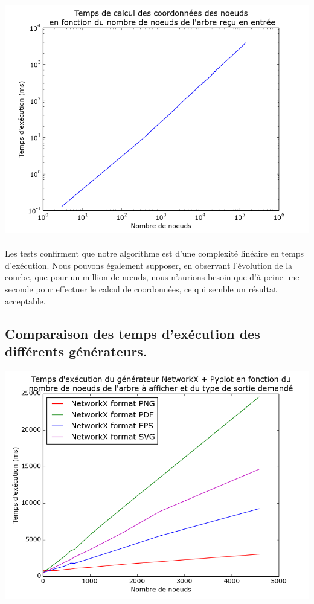 \begin{center}

\includegraphics[width=\columnwidth]{execTimeCoord}

\end{center}

\paragraph{} Les tests confirment que notre algorithme est d'une complexité linéaire en temps d'exécution. Nous pouvons également supposer, en observant l'évolution de la courbe, que pour un million de n\oe uds, nous n'aurions besoin que d'à peine une seconde pour effectuer le calcul de coordonnées, ce qui semble un résultat acceptable.

	\subsection{Comparaison des temps d'exécution des différents générateurs.}

\begin{center}

\includegraphics[width=\columnwidth]{execTimeNX}

\end{center}

